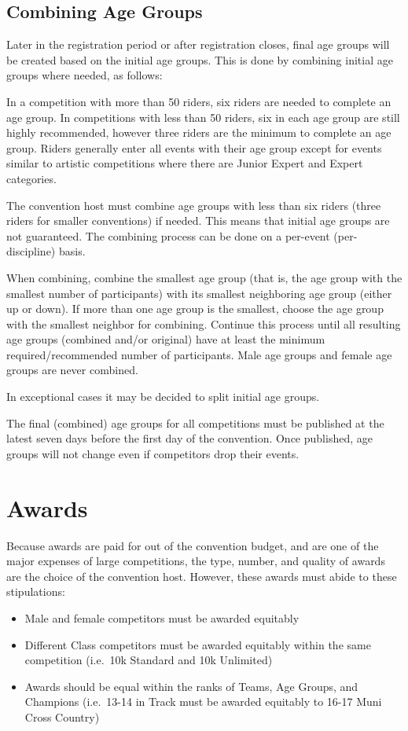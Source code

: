 \subsection{Combining Age Groups \label{subsec:general_host's-option-unicon_combining-age-groups}}

Later in the registration period or after registration closes, final age groups will be created based on the initial age groups.
This is done by combining initial age groups where needed, as follows:

In a competition with more than 50 riders, six riders are needed to complete an age group.
In competitions with less than 50 riders, six in each age group are still highly recommended, however three riders are the minimum to complete an age group.
Riders generally enter all events with their age group except for events similar to artistic competitions where there are Junior Expert and Expert categories.

The convention host must combine age groups with less than six riders (three riders for smaller conventions) if needed.
This means that initial age groups are not guaranteed.
The combining process can be done on a per-event (per-discipline) basis.

When combining, combine the smallest age group (that is, the age group with the smallest number of participants) with its smallest neighboring age group (either up or down).
If more than one age group is the smallest, choose the age group with the smallest neighbor for combining.
Continue this process until all resulting age groups (combined and/or original) have at least the minimum required/recommended number of participants.
Male age groups and female age groups are never combined.

In exceptional cases it may be decided to split initial age groups.

The final (combined) age groups for all competitions must be published at the latest seven days before the first day of the convention.
Once published, age groups will not change even if competitors drop their events.

\section{Awards}

Because awards are paid for out of the convention budget, and are one of the major expenses of large competitions, the type, number, and quality of awards are the choice of the convention host.
However, these awards must abide to these stipulations:
\begin{itemize}
\item Male and female competitors must be awarded equitably
\item Different Class competitors must be awarded equitably within the same competition (i.e.\ 10k Standard and 10k Unlimited)
\item Awards should be equal within the ranks of Teams, Age Groups, and Champions (i.e.\ 13-14 in Track must be awarded equitably to 16-17 Muni Cross Country)
\end{itemize}

